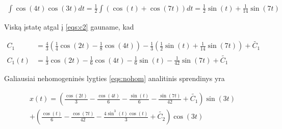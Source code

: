 \documentclass[11pt]{article}
\begin{document}
\begin{align*}
\int\cos(4t)\cos(3t)dt=
\frac{1}{2}\int(\cos(t)+\cos(7t))dt=
\frac{1}{2}\sin(t)+\frac{1}{14}\sin(7t)
\end{align*}

Viską įstatę atgal į \eqref{eqs:c2} gauname, kad

\begin{align*}
C_1&=\frac{4}{3}\left(\frac{1}{4}\cos(2t)-\frac{1}{8}\cos(4t)\right)-\frac{1}{3}\left(\frac{1}{2}\sin(t)+\frac{1}{14}\sin(7t)\right)+\tilde{C_1}\\
C_1(t)&=\frac{1}{3}\cos(2t)-\frac{1}{6}\cos(4t)-\frac{1}{6}\sin(t)-\frac{1}{42}\sin(7t)+\tilde{C_1}
\end{align*}

Galiausiai nehomogeninės lygties \eqref{eqs:nohom} analitinis sprendinys yra

\begin{align}
x(t)=
\left(\frac{\cos(2t)}{3}-\frac{\cos(4t)}{6}-\frac{\sin(t)}{6}-\frac{\sin(7t)}{42}+\tilde{C_1}\right)\sin(3t)\\
+\left(\frac{\cos(t)}{6}-\frac{\cos(7t)}{42}-\frac{4\sin^3(t)\cos(t)}{3}+\tilde{C_2}\right)\cos(3t)
\end{align}
\end{document}
